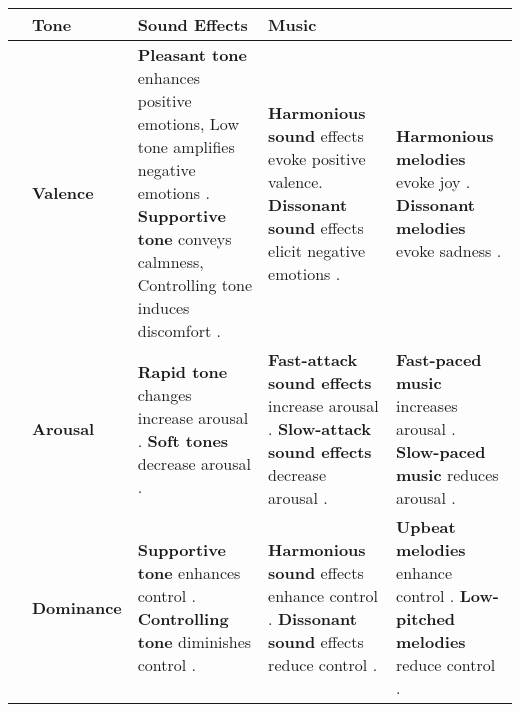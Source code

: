 \renewcommand{\arraystretch}{1.8} %
\captionsetup{font=small}

\begin{table*}[ht]
\fontsize{8}{9}\selectfont
\centering
\begin{tabularx}{\textwidth}{|>{\centering\arraybackslash}m{0.6cm}|>{\centering\arraybackslash}m{1.55cm}|>{\centering\arraybackslash}m{4.6cm}|>{\centering\arraybackslash}m{4.6cm}|>{\centering\arraybackslash}m{4.6cm}|} 
\hline
\rowcolor[HTML]{D9EAD3} 
\multicolumn{2}{|c|}{\textbf{Dimension}} & \textbf{Tone} & \textbf{Sound Effects} & \textbf{Music} \\ \hline

\multirow{3}{*}{\rotatebox{90}{\parbox{3cm}{\centering \textbf{Emotional \\ Dimensions}}}} & 
\cellcolor[HTML]{FDF6E8} \textbf{Valence} & 
\textbf{Pleasant tone} enhances positive emotions, Low tone amplifies negative emotions \cite{schirmer2010mark}. 
\textbf{Supportive tone} conveys calmness, Controlling tone induces discomfort \cite{weinstein2018you}. & 
\textbf{Harmonious sound} effects evoke positive valence. \textbf{Dissonant sound} effects elicit negative emotions \cite{parncutt2011consonance}. & 
\textbf{Harmonious melodies} evoke joy \cite{hofbauer2024background}. \textbf{Dissonant melodies} evoke sadness \cite{kabre2024predisposed}. \\ \cline{2-5}

& \cellcolor[HTML]{FDF6E8} \textbf{Arousal} & 
\textbf{Rapid tone} changes increase arousal \cite{bestelmeyer2017effects}. \textbf{Soft tones} decrease arousal \cite{gobl2003role}. &  
\textbf{Fast-attack sound effects} increase arousal \cite{clewett2024emotional}. \textbf{Slow-attack sound effects} decrease arousal \cite{eerola2012timbre}. & 
\textbf{Fast-paced music} increases arousal \cite{hofbauer2024background}. \textbf{Slow-paced music} reduces arousal \cite{shepherd2024investigating}. \\ \cline{2-5}

& \cellcolor[HTML]{FDF6E8} \textbf{Dominance} & 
\textbf{Supportive tone} enhances control \cite{weinstein2018you}. \textbf{Controlling tone} diminishes control \cite{james1884mind}. & 
\textbf{Harmonious sound} effects enhance control \cite{james1884mind}. \textbf{Dissonant sound} effects reduce control \cite{james1884mind}. & 
\textbf{Upbeat melodies} enhance control \cite{moon2024investigating}. \textbf{Low-pitched melodies} reduce control \cite{shepherd2024investigating}. \\ \hline


\end{tabularx}
\end{table*}
